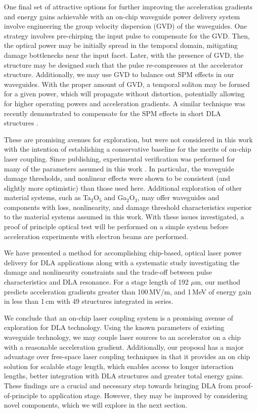 One final set of attractive options for further improving the acceleration gradients and energy gains achievable with an on-chip waveguide power delivery system involve engineering the group velocity dispersion (GVD) of the waveguides.  One strategy involves pre-chirping the input pulse to compensate for the GVD.  Then, the optical power may be initially spread in the temporal domain, mitigating damage bottlenecks near the input facet.  Later, with the presence of GVD, the structure may be designed such that the pulse re-compresses at the accelerator structure.  Additionally, we may use GVD to balance out SPM effects in our waveguides.  With the proper amount of GVD, a temporal soliton may be formed for a given power, which will propagate without distortion, potentially allowing for higher operating powers and acceleration gradients. A similar technique was recently demonstrated to compensate for the SPM effects in short DLA structures \cite{cesar2017nonlinear}. 

These are promising avenues for exploration, but were not considered in this work with the intention of establishing a conservative baseline for the merits of on-chip laser coupling.  Since publishing, experimental verification was performed for many of the parameters assumed in this work \cite{tan2019silicon}.  In particular, the waveguide damage thresholds, and nonlinear effects were shown to be consistent (and slightly more optimistic) than those used here.  Additional exploration of other material systems, such as Ta$_2$O$_5$ \cite{belt2017ultra} and Ga$_2$O$_3$, may offer waveguides and components with loss, nonlinearity, and damage threshold characteristics superior to the material systems assumed in this work. With these issues investigated, a proof of principle optical test will be performed on a simple system before acceleration experiments with electron beams are performed.

We have presented a method for accomplishing chip-based, optical laser power delivery for DLA applications along with a systematic study investigating the damage and nonlinearity constraints and the trade-off between pulse characteristics and DLA resonance.  For a stage length of 192 $\mu$m, our method predicts acceleration gradients greater than 100\,MV/m, and 1\,MeV of energy gain in less than 1\,cm with 49 structures integrated in series.

We conclude that an on-chip laser coupling system is a promising avenue of exploration for DLA technology.  Using the known parameters of existing waveguide technology, we may couple laser sources to an accelerator on a chip with a reasonable acceleration gradient.  Additionally, our proposal has a major advantage over free-space laser coupling techniques in that it provides an on chip solution for scalable stage length, which enables access to longer interaction lengths, better integration with DLA structures and greater total energy gains.  These findings are a crucial and necessary step towards bringing DLA from proof-of-principle to application stage.  However, they may be improved by considering novel components, which we will explore in the next section.

